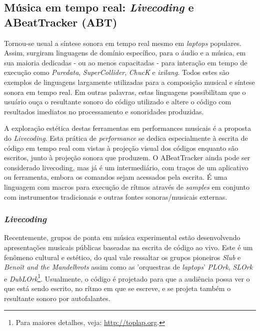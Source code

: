 
\vspace{10mm}
\subsection{Música em tempo real: \emph{Livecoding} e ABeatTracker (ABT)}

Tornou-se usual a síntese
sonora em tempo real mesmo em \emph{laptops} populares.
Assim, surgiram linguagens de
domínio específico, para o áudio e a música, em sua maioria dedicadas
- ou ao menos capacitadas - para interação em tempo de
execução como \emph{Puredata}, \emph{SuperCollider}, \emph{ChucK}
 e \emph{ixilang}. Todos estes são exemplos de
linguagens largamente utilizadas para a composição musical e síntese
sonora em tempo real. Em outras palavras, estas linguagens
possibilitam que o usuário ouça o resultante sonoro do código
utilizado e altere o código com resultados imediatos no processamento e
sonoridades produzidas.

A exploração estética destas ferramentas 
em performances musicais é a proposta do \emph{Livecoding}.
Esta prática de \emph{performance} se dedica
especialmente à escrita de código em
tempo real com vistas à projeção visual dos códigos enquanto
são escritos, junto à projeção sonora que produzem.
O ABeatTracker ainda pode ser considerado
livecoding, mas já é um intermediário, com traços
de um aplicativo ou ferramenta, embora os comandos sejam acessados
pela escrita. É uma linguagem
com macros para execução de rítmos através de \emph{samples}
em conjunto com instrumentos
tradicionais e outras fontes sonoras/musicais externas.

\subsubsection{\emph{Livecoding}}

Recentemente, grupos de ponta em música experimental
estão desenvolvendo apresentações musicais públicas baseadas na
escrita de código ao vivo. Este é um fenômeno cultural e
estético, do qual vale ressaltar os grupos pioneiros
\emph{Slub} e \emph{Benoît and the Mandelbrots} assim como
as 'orquestras de \emph{laptops}'
\emph{PLOrk}, \emph{SLOrk} e \emph{DubLOrk}\footnote{Para maiores detalhes, veja:
  \url{http://toplap.org}.}. Usualmente, o código é projetado para que a
audiência possa ver o que está sendo escrito, no rítmo em que se
escreve, e se projeta também o resultante sonoro por autofalantes.



